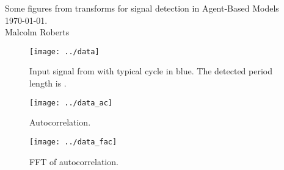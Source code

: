 \documentclass[a4paper]{article}
\newcommand{\thetitle}{Some figures from transforms for signal
  detection in Agent-Based Models}
\newcommand{\theauthor}{Malcolm Roberts}
\begin{document}
\begin{center}
  \thetitle{}\\
  \today.\\
  \theauthor{}
\end{center}








\begin{figure}[htbp]
  \begin{center}        
    \texttt{[image: ../data]}
    \caption{Input signal from \texttt{\filename} with typical cycle
      in blue. The detected period length is \periodlength{}.}
  \end{center}
\end{figure}

\begin{figure}[htbp]
  \begin{center}        
    \texttt{[image: ../data\_ac]}
    \caption{Autocorrelation.}
  \end{center}
\end{figure}

\begin{figure}[htbp]
  \begin{center}
    \texttt{[image: ../data\_fac]}
    \caption{FFT of autocorrelation.}
  \end{center}
\end{figure}
\end{document}
